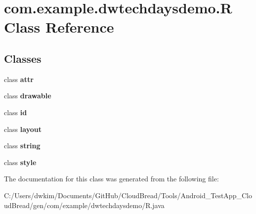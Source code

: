 \hypertarget{a00171}{}\section{com.\+example.\+dwtechdaysdemo.\+R Class Reference}
\label{a00171}
\subsection*{Classes}
\begin{DoxyCompactItemize}
\item 
class {\bfseries attr}
\item 
class {\bfseries drawable}
\item 
class {\bfseries id}
\item 
class {\bfseries layout}
\item 
class {\bfseries string}
\item 
class {\bfseries style}
\end{DoxyCompactItemize}


The documentation for this class was generated from the following file\+:\begin{DoxyCompactItemize}
\item 
C\+:/\+Users/dwkim/\+Documents/\+Git\+Hub/\+Cloud\+Bread/\+Tools/\+Android\+\_\+\+Test\+App\+\_\+\+Cloud\+Bread/gen/com/example/dwtechdaysdemo/R.\+java\end{DoxyCompactItemize}

